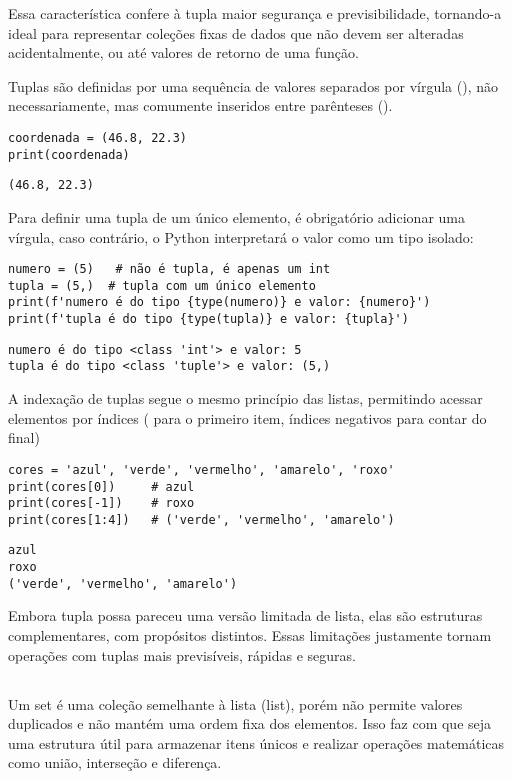 Essa característica confere à tupla maior segurança e previsibilidade, tornando-a ideal para representar coleções
fixas de dados que não devem ser alteradas acidentalmente, ou até valores de retorno de uma função.

Tuplas são definidas por uma sequência de valores separados por vírgula (\inlcode{,}), não necessariamente, mas comumente
inseridos entre parênteses (\inlcode{()}).
\begin{verbatim}
coordenada = (46.8, 22.3)
print(coordenada)
\end{verbatim}
\begin{verbatim}
(46.8, 22.3)
\end{verbatim}

Para definir uma tupla de um único elemento, é obrigatório adicionar uma vírgula,
caso contrário, o Python interpretará o valor como um tipo isolado:
\begin{verbatim}
numero = (5)   # não é tupla, é apenas um int
tupla = (5,)  # tupla com um único elemento
print(f'numero é do tipo {type(numero)} e valor: {numero}')
print(f'tupla é do tipo {type(tupla)} e valor: {tupla}')
\end{verbatim}
\begin{verbatim}
numero é do tipo <class 'int'> e valor: 5
tupla é do tipo <class 'tuple'> e valor: (5,)
\end{verbatim}


A indexação de tuplas segue o mesmo princípio das listas,
permitindo acessar elementos por índices ( para o primeiro item, índices negativos para contar do final)
\begin{verbatim}
cores = 'azul', 'verde', 'vermelho', 'amarelo', 'roxo'
print(cores[0])     # azul
print(cores[-1])    # roxo
print(cores[1:4])   # ('verde', 'vermelho', 'amarelo')
\end{verbatim}
\begin{verbatim}
azul
roxo
('verde', 'vermelho', 'amarelo')
\end{verbatim}

Embora tupla possa pareceu uma versão limitada de lista, elas são estruturas complementares, com propósitos distintos.
Essas limitações justamente tornam operações com tuplas mais previsíveis, rápidas e seguras.




\subsection{}
Um set é uma coleção semelhante à lista (list), porém não permite valores duplicados e não mantém uma ordem fixa dos
elementos.
Isso faz com que seja uma estrutura útil para armazenar itens únicos e realizar operações matemáticas como união,
interseção e diferença.


